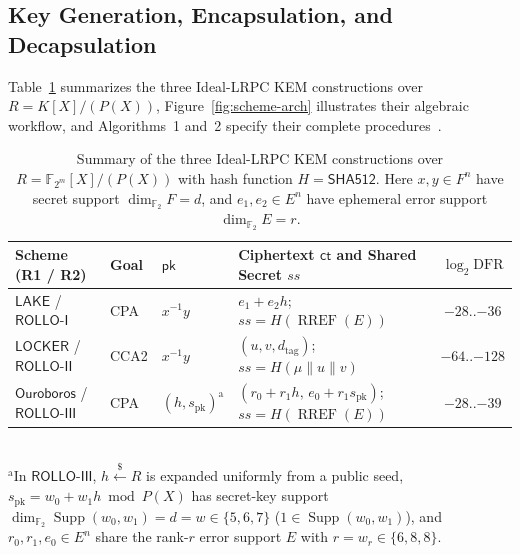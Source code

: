 \documentclass[11pt,a4paper]{article}
\theoremstyle{definition}
\theoremstyle{remark}
\newcommand{\F}{\mathbb{F}}
\newcommand{\Ftwo}{\mathbb{F}_2}
\newcommand{\Supp}{\operatorname{Supp}}
\newcommand{\RREF}{\operatorname{RREF}}
\newcommand{\SHA}{\mathsf{SHA512}}
\begin{document}
\subsection{Key Generation, Encapsulation, and Decapsulation}
Table~\ref{tab:scheme-lineage} summarizes the three Ideal-LRPC KEM constructions over $R = K[X]/(P(X))$, Figure~\ref{fig:scheme-arch} illustrates their algebraic workflow, and Algorithms~1 and~2 specify their complete procedures~\cite{LOCKER17,ROLLO19,ROLLO20}.

\begin{table}[t]
\centering
\small
\caption{Summary of the three Ideal-LRPC KEM constructions over $R = \F_{2^m}[X]/(P(X))$ with hash function $H = \SHA$. Here $x, y \in F^n$ have secret support $\dim_{\Ftwo} F = d$, and $e_1, e_2 \in E^n$ have ephemeral error support $\dim_{\Ftwo} E = r$.}
\label{tab:scheme-lineage}
\setlength{\tabcolsep}{4.0pt}
\begin{tabular}{@{}llllc@{}}
\toprule
\textbf{Scheme (R1 / R2)} & \textbf{Goal} & \textbf{$\mathsf{pk}$} & \textbf{Ciphertext $\mathsf{ct}$ and Shared Secret $ss$} & \textbf{$\log_2\mathrm{DFR}$} \\
\midrule
$\mathsf{LAKE}$ / $\mathsf{ROLLO\text{-}I}$ & CPA & $x^{-1}y$ & $e_1 + e_2 h$;\; $ss = H(\RREF(E))$ & $-28\text{..}{-36}$ \\
$\mathsf{LOCKER}$ / $\mathsf{ROLLO\text{-}II}$ & CCA2 & $x^{-1}y$ & $(u, v, d_{\text{tag}})$;\; $ss = H(\mu \parallel u \parallel v)$ & $-64\text{..}{-128}$ \\
$\mathsf{Ouroboros}$ / $\mathsf{ROLLO\text{-}III}$ & CPA & $(h, s_{\text{pk}})^{\mathrm{a}}$ & $(r_0{+}r_1 h,\, e_0{+}r_1 s_{\text{pk}})$;\; $ss = H(\RREF(E))$ & $-28\text{..}{-39}$ \\
\bottomrule
\end{tabular}
\\[0.3em]
{\scriptsize $^{\mathrm{a}}$In $\mathsf{ROLLO\text{-}III}$, $h \xleftarrow{\$} R$ is expanded uniformly from a public seed, $s_{\text{pk}} = w_0 + w_1 h \bmod P(X)$ has secret-key support $\dim_{\Ftwo}\Supp(w_0,w_1) = d = w \in \{5,6,7\}$ ($1 \in \Supp(w_0,w_1)$), and $r_0, r_1, e_0 \in E^n$ share the rank-$r$ error support $E$ with $r = w_r \in \{6,8,8\}$.}
\end{table}
\end{document}
